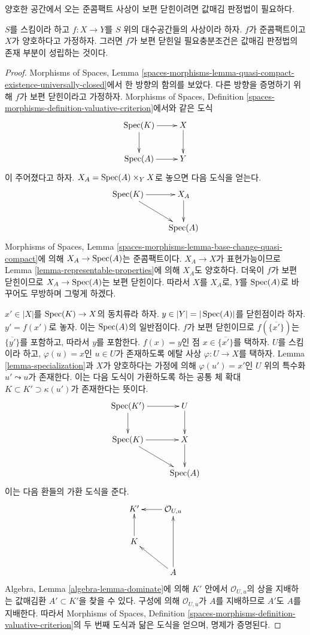 \noindent
양호한 공간에서 오는 준콤팩트 사상이 보편 닫힌이려면 값매김 판정법이
필요하다.


\begin{proposition}
\label{proposition-characterize-universally-closed}
$S$를 스킴이라 하고 $f : X \to Y$를 $S$ 위의 대수공간들의 사상이라
하자. $f$가 준콤팩트이고 $X$가 양호하다고 가정하자. 그러면 $f$가
보편 닫힌일 필요충분조건은 값매김 판정법의 존재 부분이 성립하는
것이다.
\end{proposition}

\begin{proof}
Morphisms of Spaces, Lemma
\ref{spaces-morphisms-lemma-quasi-compact-existence-universally-closed}에서
한 방향의 함의를 보았다. 다른 방향을 증명하기 위해 $f$가 보편
닫힌이라고 가정하자. Morphisms of Spaces, Definition
\ref{spaces-morphisms-definition-valuative-criterion}에서와 같은 도식
$$
\xymatrix{
\Spec(K) \ar[r] \ar[d] & X \ar[d] \\
\Spec(A) \ar[r] & Y
}
$$
이 주어졌다고 하자. $X_A = \mathop{\mathrm{Spec}}(A) \times_Y X$로 놓으면 다음 도식을
얻는다.
$$
\xymatrix{
\Spec(K) \ar[r] \ar[rd] & X_A \ar[d] \\
 & \Spec(A)
}
$$
Morphisms of Spaces, Lemma
\ref{spaces-morphisms-lemma-base-change-quasi-compact}에 의해
$X_A \to \mathop{\mathrm{Spec}}(A)$는 준콤팩트이다. $X_A \to X$가 표현가능이므로
Lemma \ref{lemma-representable-properties}에 의해 $X_A$도 양호하다.
더욱이 $f$가 보편 닫힌이므로 $X_A \to \mathop{\mathrm{Spec}}(A)$는 보편 닫힌이다.
따라서 $X$를 $X_A$로, $Y$를 $\mathop{\mathrm{Spec}}(A)$로 바꾸어도 무방하며 그렇게
하겠다.

\medskip\noindent
$x' \in |X|$를 $\mathop{\mathrm{Spec}}(K) \to X$의 동치류라 하자.
$y \in |Y| = |\mathop{\mathrm{Spec}}(A)|$를 닫힌점이라 하자. $y' = f(x')$로 놓자.
이는 $\mathop{\mathrm{Spec}}(A)$의 일반점이다. $f$가 보편 닫힌이므로
$f(\overline{\{x'\}})$는 $\overline{\{y'\}}$를 포함하고, 따라서
$y$를 포함한다. $f(x) = y$인 점 $x \in \overline{\{x'\}}$를 택하자.
$U$를 스킴이라 하고, $\varphi(u) = x$인 $u \in U$가 존재하도록
에탈 사상 $\varphi : U \to X$를 택하자.
Lemma \ref{lemma-specialization}과 $X$가 양호하다는 가정에 의해
$\varphi(u') = x'$인 $U$ 위의 특수화 $u' \leadsto u$가 존재한다.
이는 다음 도식이 가환하도록 하는 공통 체 확대
$K \subset K' \supset \kappa(u')$가 존재한다는 뜻이다.
$$
\xymatrix{
\Spec(K') \ar[r] \ar[d] & U \ar[d] \\
\Spec(K) \ar[r] \ar[rd] & X \ar[d] \\
 & \Spec(A)
}
$$
이는 다음 환들의 가환 도식을 준다.
$$
\xymatrix{
K' & \mathcal{O}_{U, u} \ar[l] \\
K \ar[u] & \\
 & A \ar[lu] \ar[uu]
}
$$
Algebra, Lemma \ref{algebra-lemma-dominate}에 의해 $K'$ 안에서
$\mathcal{O}_{U, u}$의 상을 지배하는 값매김환 $A' \subset K'$을
찾을 수 있다. 구성에 의해 $\mathcal{O}_{U, u}$가 $A$를 지배하므로
$A'$도 $A$를 지배한다. 따라서 Morphisms of Spaces, Definition
\ref{spaces-morphisms-definition-valuative-criterion}의 두 번째 도식과
닮은 도식을 얻으며, 명제가 증명된다.
\end{proof}

